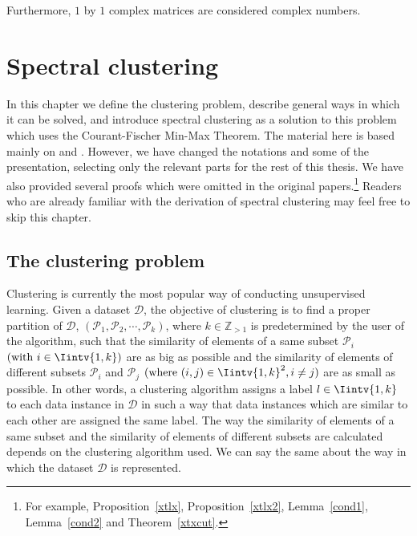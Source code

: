 Furthermore, $1$ by $1$ complex matrices are considered complex numbers.





\chapter{Spectral clustering}
In this chapter we define the clustering problem, describe general ways in which it can be solved, and introduce
spectral clustering as a solution to this problem which uses the Courant-Fischer Min-Max Theorem.
The material here is based mainly on \cite{ng} and \cite{tutorial}.
However, we have changed the notations and some of the presentation, selecting only the relevant parts for the rest of this thesis.
We have also provided several proofs which were omitted in the original papers.\footnote{For example, Proposition~\vref{xtlx}, Proposition~\vref{xtlx2}, Lemma~\vref{cond1}, Lemma~\vref{cond2} and Theorem~\vref{xtxcut}.}
Readers who are already familiar with the derivation of spectral clustering may feel free to skip this chapter. 

\section{The clustering problem}

Clustering is currently the most popular way of conducting unsupervised learning. 
Given a dataset $\mathcal D$, the objective of clustering is to find a proper partition of $\mathcal D$, $(\mathcal P_1, \mathcal P_2, \cdots, \mathcal P_k)$, where $k \in \mathbb Z_{>1}$ is predetermined by the user of the algorithm, such that the similarity of elements of a same subset $\mathcal P_i$  $(\text{with } i \in \Iintv{1,k})$ are as big as possible and the similarity of elements of different subsets $\mathcal P_i$ and $\mathcal P_j$ $(\text{where } (i,j) \in \Iintv{1,k}^2, i \ne j)$ are as small as possible. 
In other words, a clustering algorithm assigns a label $l \in \Iintv{1,k}$ to each data instance in $\mathcal D$ in such a way that data instances which are similar to each other are assigned the same label.
The way the similarity of elements of a same subset and the similarity of elements of different subsets are calculated depends on the clustering algorithm used. 
We can say the same about the way in which the dataset $\mathcal D$ is represented.

